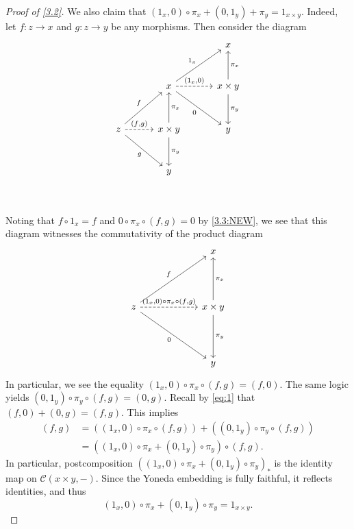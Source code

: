 \begin{proof}[Proof of \cref{3.2}]
	We also claim that $(1_x,0)\circ \pi _x + (0,1_y)+\pi _y = 1_{x\times y} $. Indeed, let $f : z \to x$ and $g : z \to y$ be any morphisms. Then consider the diagram
	\[\begin{tikzcd}[row sep = 3em, column sep = 3em]
	 &  & x \\
	 & x \ar[" 1_x ", ur] \ar[" 0 "', dr] \ar[" (1_x\text{,} 0) ", dashed, r]  & x\times y \ar[" \pi _y ", d] \ar[" \pi _x "', u]  \\
	z \ar[" f ", ur] \ar[" g "', dr] \ar[" (f\text{,} g) ", dashed, r]  & x\times y \ar[" \pi _x "', u] \ar[" \pi _y ", d]  & y \\
	 & y &  \\
	\end{tikzcd}\]
	Noting that $f\circ 1_x=f$ and $0\circ \pi _x \circ (f,g)=0$ by \cref{3.3:NEW}, we see that this diagram witnesses the commutativity of the product diagram
	\[\begin{tikzcd}[row sep = 4.5em, column sep = 6em]
	 & x \\
	z \ar[" f ", ur] \ar[" 0 "', dr] \ar[" (1_x\text{,} 0)\circ \pi _x \circ (f\text{,} g) ", dashed, r]  & x\times y \ar[" \pi _x "', u] \ar[" \pi _y ", d]  \\
	 & y
	\end{tikzcd}\]
	In particular, we see the equality $(1_x,0)\circ \pi _x \circ (f,g)=(f,0)$. The same logic yields $(0,1_y)\circ \pi _y \circ (f,g)=(0,g)$. Recall by \eqref{eq:1} that $(f,0)+(0,g)=(f,g)$. This implies
	\begin{align*}
		(f,g)&=((1_x,0)\circ \pi _x \circ (f,g))+((0,1_y)\circ \pi _y\circ (f,g))\\
		     &=((1_x,0)\circ \pi _x+(0,1_y)\circ \pi _y)\circ (f,g)
	.\end{align*}
	In particular, postcomposition $((1_x,0)\circ \pi _x+(0,1_y)\circ \pi _y)_*$ is the identity map on $\mathcal{C} (x\times y,-)$. Since the Yoneda embedding is fully faithful, it reflects identities, and thus
	\begin{equation}\label{eq:2}
		(1_x,0)\circ \pi _x + (0,1_y)\circ \pi _y = 1_{x\times y}.\tag{$\star\star $}
	\end{equation}


\end{proof}
